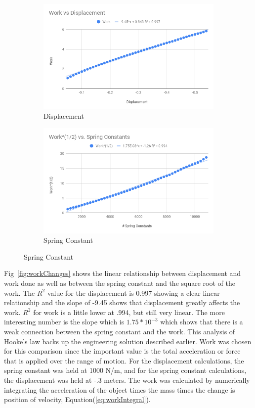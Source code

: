 \documentclass[12pt, letterpaper]{article}
\begin{document}
\begin{figure}[h]
  \caption{Work given variables}
  \label{fig:workChanges}
  \centering
  \begin{subfigure}[b]{.45\linewidth}
    \includegraphics[width=\linewidth]{displacementRegress.png}
    \caption{Displacement}
  \end{subfigure}
  \begin{subfigure}[b]{.45\linewidth}
    \includegraphics[width=\linewidth]{springRegress.png}
    \caption{Spring Constant}
  \end{subfigure}
\end{figure}
\newpage
Fig~\ref{fig:workChanges} shows the linear relationship between displacement and work done as well as between
the spring constant and the square root of the work. The $R^2$ value for the displacement is 0.997 showing a
clear linear relationship and the slope of -9.45 shows that displacement greatly affects the work. $R^2$ for
work is a little lower at .994, but still very linear. The more interesting number is the slope which is
$1.75*10^{-3}$ which shows that there is a weak connection between the spring constant and the work. This
analysis of Hooke's law backs up the engineering solution described earlier. Work was chosen for this
comparison since the important value is the total acceleration or force that is applied over the range of
motion. For the displacement calculations, the spring constant was held at 1000 N/m, and for the spring
constant calculations, the displacement was held at -.3 meters. The work was calculated by numerically
integrating the acceleration of the object times the mass times the change is position of velocity,
Equation(\ref{eq:workIntegral}).
\end{document}

